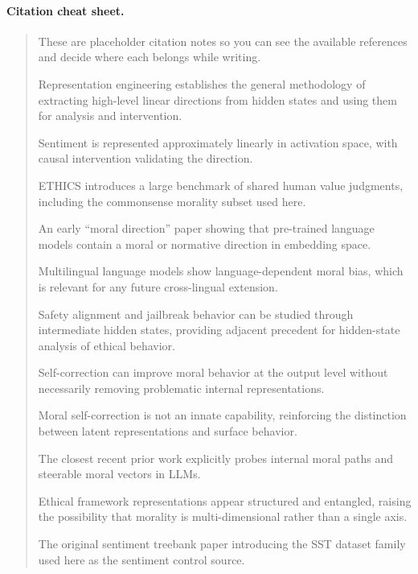 \documentclass[11pt]{article}
\newcommand{\draftnote}[1]{%
  \begin{quote}\footnotesize\color{gray}#1\end{quote}%
}
\begin{document}
\paragraph{Citation cheat sheet.}
\draftnote{
These are placeholder citation notes so you can see the available references and decide where each belongs while writing.
\begin{description}[leftmargin=8em,style=nextline]
    \item[\cite{zou2023representation}] Representation engineering establishes the general methodology of extracting high-level linear directions from hidden states and using them for analysis and intervention.
    \item[\cite{tigges2024language}] Sentiment is represented approximately linearly in activation space, with causal intervention validating the direction.
    \item[\cite{hendrycks2021aligning}] ETHICS introduces a large benchmark of shared human value judgments, including the commonsense morality subset used here.
    \item[\cite{schramowski2022large}] An early ``moral direction'' paper showing that pre-trained language models contain a moral or normative direction in embedding space.
    \item[\cite{haemmerl2023speaking}] Multilingual language models show language-dependent moral bias, which is relevant for any future cross-lingual extension.
    \item[\cite{zhou2024alignment}] Safety alignment and jailbreak behavior can be studied through intermediate hidden states, providing adjacent precedent for hidden-state analysis of ethical behavior.
    \item[\cite{liu2024intrinsic}] Self-correction can improve moral behavior at the output level without necessarily removing problematic internal representations.
    \item[\cite{liu2025moral}] Moral self-correction is not an innate capability, reinforcing the distinction between latent representations and surface behavior.
    \item[\cite{hu2026straight}] The closest recent prior work explicitly probes internal moral paths and steerable moral vectors in LLMs.
    \item[\cite{xu2026probing}] Ethical framework representations appear structured and entangled, raising the possibility that morality is multi-dimensional rather than a single axis.
    \item[\cite{socher2013recursive}] The original sentiment treebank paper introducing the SST dataset family used here as the sentiment control source.

\end{description}}
\end{document}
